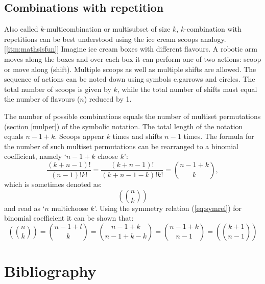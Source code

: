\documentclass{article}
\makeatletter
\newcommand*{\eg}{e.g\@ifnextchar{.}{}{.\@\xspace}}
\makeatother
\begin{document}
\subsection{Combinations with repetition}

Also called $k$\nobreakdash-\hspace{0pt}multicombination or multisubset of size $k$, $k$\nobreakdash-\hspace{0pt}combination with repetitions can be best understood using the ice cream scoops analogy.\hyperref[itm:mathsisfun]{[\ref*{itm:mathsisfun}]}
Imagine ice cream boxes with different flavours.
A robotic arm moves along the boxes and over each box it can perform one of two actions: scoop or move along (shift).
Multiple scoops as well as multiple shifts are allowed.
The sequence of actions can be noted down using symbols \eg arrows and circles.
The total number of scoops is given by $k$, while the total number of shifts must equal the number of flavours ($n$) reduced by 1.

The number of possible combinations equals the number of multiset permutations (\hyperref[mulper]{section \ref*{mulper}}) of the symbolic notation.
The total length of the notation equals $n-1+k$.
Scoops appear $k$ times and shifts $n-1$ times.
The formula for the number of such multiset permutations can be rearranged to a binomial coefficient, namely `$n-1+k$ choose $k$':
\begin{equation}
    \frac{(k+n-1)!}{(n-1)!k!} = \frac{(k+n-1)!}{(k+n-1-k)!k!} = \binom{n-1+k}{k},
\end{equation}
which is sometimes denoted as:
\begin{equation*}
    \left(\!\!\!\binom{n}{k}\!\!\!\right)
\end{equation*}
and read as `$n$ multichoose $k$'. Using the symmetry relation (\hyperref[eq:symrel]{\ref*{eq:symrel}}) for binomial coefficient it can be shown that:
\begin{equation}
    \left(\!\!\!\binom{n}{k}\!\!\!\right) = \binom{n-1+l}{k} = \binom{n-1+k}{n-1+k-k} = \binom{n-1+k}{n-1} = \left(\!\!\!\binom{k+1}{n-1}\!\!\!\right)
\end{equation}

\section*{Bibliography}
\end{document}
